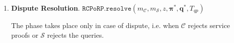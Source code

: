 \begin{enumerate}
 
 
  


\



\item \textbf{Dispute Resolution}. \label{RCPoRP::Dispute-Resolution} $\mathtt{RCPoRP}. \mathtt{resolve}(m_{\scriptscriptstyle \mathcal{C}},m_{\scriptscriptstyle \mathcal{S}}, z, {\bm{\pi}}^{\scriptscriptstyle *}, {\bm{q}^{\scriptscriptstyle *}},  T_{\scriptscriptstyle qp})$



The phase takes place only in  case of dispute, i.e. when $\mathcal C$ rejects service proofs or $\mathcal S$ rejects the queries. %


\end{enumerate}
